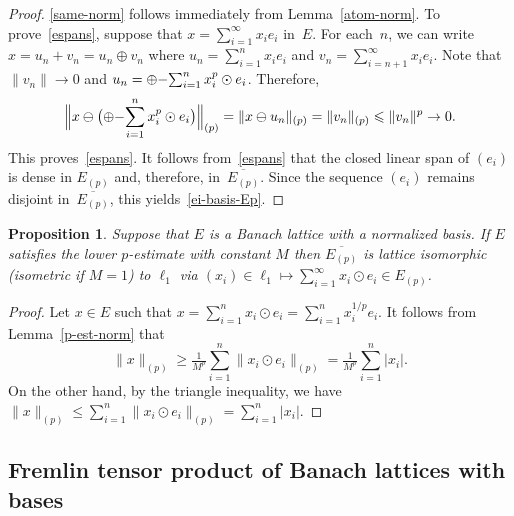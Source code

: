 \documentclass[12pt]{amsart}
\theoremstyle{plain}
\newtheorem{proposition}[theorem]{Proposition}
\theoremstyle{definition}
\newcommand{\abs}[1]{\lvert#1\rvert}
\newcommand{\norm}[1]{\lVert#1\rVert}
\newcommand{\Bignorm}[1]{\Bigl\lVert#1\Bigr\rVert}
\renewcommand{\le}{\leqslant}
\renewcommand{\ge}{\geqslant}
\newcommand{\marg}[1]{\marginpar{\tiny #1}}
\begin{document}
\begin{proof}
  \eqref{same-norm} follows immediately from Lemma~\ref{atom-norm}. To
  prove~\eqref{espans}, suppose that
  $x=\sum_{i=1}^\infty x_ie_i$ in~$E$. For each~$n$, we can write
  $x=u_n+v_n=u_n\oplus v_n$ where $u_n=\sum_{i=1}^n x_ie_i$ and
  $v_n=\sum_{i=n+1}^\infty x_ie_i$. Note that $\norm{v_n}\to 0$ and
   $u_n=\oplus{\rm
    -}\!\sum_{i=1}^n x_i^p\odot e_i$. Therefore,
  \begin{displaymath}
    \Bignorm{x\ominus\bigl(\oplus{\rm -}\!\sum_{i=1}^n
       x_i^p\odot e_i\bigr)}_{(p)}
    =\norm{x\ominus u_n}_{(p)}
    =\norm{v_n}_{(p)}
    \le\norm{v_n}^p\to 0.
  \end{displaymath}
  This proves~\eqref{espans}. It follows from~\eqref{espans} that the
  closed linear span of $(e_i)$ is dense in $E_{(p)}$ and, therefore,
  in~$\overline{E_{(p)}}$. Since the sequence $(e_i)$ remains disjoint
  in~$\overline{E_{(p)}}$, this yields~\eqref{ei-basis-Ep}.
\end{proof}

\begin{proposition}\label{p-est-basis}
  Suppose that $E$ is a Banach lattice with a normalized basis. If $E$
  satisfies the lower $p$-estimate with constant $M$ then
  $\overline{E_{(p)}}$ is lattice isomorphic (isometric if $M=1$) to
  $\ell_1$ via $(x_i)\in\ell_1\mapsto\sum_{i=1}^\infty x_i\odot e_i\in E_{(p)}$.
\end{proposition}

\begin{proof}
  Let $x\in E$ such that $x=\sum_{i=1}^n x_i\odot e_i=\sum_{i=1}^n
  x_i^{1/p}e_i$. It follows from Lemma~\ref{p-est-norm} that
  \begin{displaymath}
    \norm{x}_{(p)}
    \ge\tfrac{1}{M^p}\sum_{i=1}^n\norm{x_i\odot e_i}_{(p)}
    =\tfrac{1}{M^p}\sum_{i=1}^n\abs{x_i}.
  \end{displaymath}
  On the other hand, by the triangle inequality, we have
  \begin{math}
    \norm{x}_{(p)}
    \le\sum_{i=1}^n\norm{x_i\odot e_i}_{(p)}
    =\sum_{i=1}^n\abs{x_i}.
  \end{math}
\end{proof}

\subsection{Fremlin tensor product of Banach lattices with bases}
\end{document}
